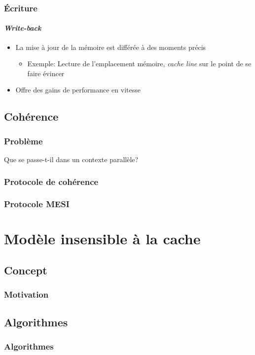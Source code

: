 \documentclass{beamer}
\begin{document}
\begin{frame}
\frametitle{Écriture}
\framesubtitle{\textit{Write-back}}
\begin{itemize}
\item La mise à jour de la mémoire est différée à des moments précis
\begin{itemize}
\item Exemple: Lecture de l'emplacement mémoire, \textit{cache line} sur le point de se faire évincer
\end{itemize}
\item Offre des gains de performance en vitesse
\end{itemize}
\end{frame}

\subsection{Cohérence}
\begin{frame}
\frametitle{Problème}
\begin{center}
\LARGE{Que se passe-t-il dans un contexte parallèle?}
\end{center}
\end{frame}

\begin{frame}
\frametitle{Protocole de cohérence}

\end{frame}

\begin{frame}
\frametitle{Protocole MESI}

\end{frame}

\section{Modèle insensible à la cache}
\subsection{Concept}
\begin{frame}
\frametitle{Motivation}

\end{frame}

\subsection{Algorithmes}
\begin{frame}
\frametitle{Algorithmes}

\end{frame}
\end{document}
